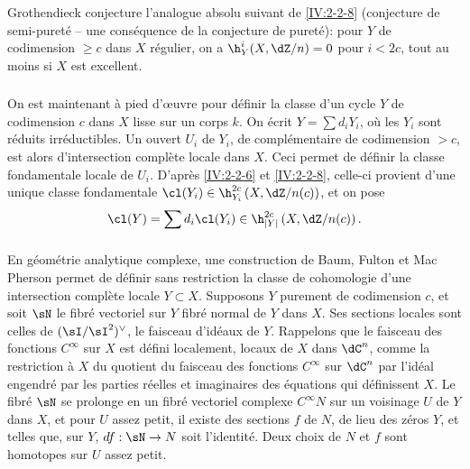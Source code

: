 \subsubsection{}\label{IV:2-2-9}

Grothendieck conjecture l'analogue absolu suivant de \ref{IV:2-2-8} (conjecture 
de semi-pureté -- une conséquence de la conjecture de pureté): pour $Y$ 
de codimension $\geqslant c$ dans $X$ régulier, on a $\h_Y^i(X,\dZ/n)=0$ pour 
$i<2 c$, tout au moins si $X$ est excellent. 





\subsubsection{}\label{IV:2-2-10}

On est maintenant à pied d'œuvre pour définir la classe d'un cycle $Y$ de 
codimension $c$ dans $X$ lisse sur un corps $k$. On écrit $Y=\sum d_i Y_i$, 
où les $Y_i$ sont réduits irréductibles. Un ouvert $U_i$ de $Y_i$, de 
complémentaire de codimension $>c$, est alors d'intersection complète 
locale dans $X$. Ceci permet de définir la classe fondamentale locale de 
$U_i$. D'après \ref{IV:2-2-6} et \ref{IV:2-2-8}, celle-ci provient d'une 
unique classe fondamentale $\cl(Y_i)\in \h_{Y_i}^{2 c}\left(X,\dZ/n(c)\right)$, 
et on pose 
\[
  \cl(Y) = \sum d_i \cl(Y_i) \in \h_{|Y|}^{2 c}\left(X,\dZ/n(c)\right) \text{.}
\]





\subsubsection{}\label{IV:2-2-11}

En géométrie analytique complexe, une construction de Baum, Fulton et 
Mac Pherson  permet de définir sans restriction la classe de 
cohomologie d'une intersection complète locale $Y\subset X$. Supposons $Y$ 
purement de codimension $c$, et soit $\sN$ le fibré vectoriel sur $Y$ fibré 
normal de $Y$ dans $X$. Ses sections locales sont celles de $(\sI/\sI^2)^\vee$, 
 le faisceau d'idéaux de $Y$. Rappelons que le faisceau des 
fonctions $C^\infty$ sur $X$ est défini localement,  
locaux de $X$ dans $\dC^n$, comme la restriction à $X$ du quotient du 
faisceau des fonctions $C^\infty$ sur $\dC^n$ par l'idéal engendré par les 
parties réelles et imaginaires des équations qui définissent $X$. Le 
fibré $\sN$ se prolonge en un fibré vectoriel complexe $C^\infty N$ sur un 
voisinage $U$ de $Y$ dans $X$, et pour $U$ assez petit, il existe des sections 
$f$ de $N$, de lieu des zéros $Y$, et telles que, sur $Y$, $d f:\sN\to N$ 
soit l'identité. Deux choix de $N$ et $f$ sont homotopes sur $U$ assez petit. 


